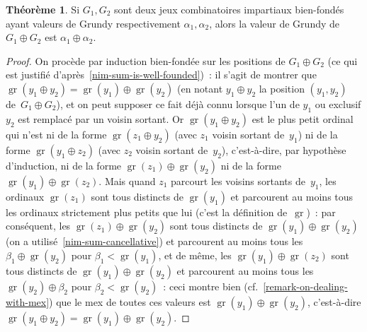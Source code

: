 \documentclass[12pt,a4paper]{article}
\theoremstyle{definition}
\newtheorem{thm}[comcnt]{Théorème}
\newcommand{\gr}{\operatorname{gr}}
\begin{document}
\begin{thm}\label{nim-sum-for-games-versus-ordinals}
Si $G_1,G_2$ sont deux jeux combinatoires impartiaux bien-fondés ayant
valeurs de Grundy respectivement $\alpha_1,\alpha_2$, alors la valeur
de Grundy de $G_1\oplus G_2$ est $\alpha_1\oplus\alpha_2$.
\end{thm}
\begin{proof}
On procède par induction bien-fondée sur les positions de $G_1\oplus
G_2$ (ce qui est justifié d'après \ref{nim-sum-is-well-founded}) : il
s'agit de montrer que $\gr(y_1 \oplus y_2) = \gr(y_1) \oplus \gr(y_2)$
(en notant $y_1\oplus y_2$ la position $(y_1,y_2)$ de $G_1\oplus
G_2$), et on peut supposer ce fait déjà connu lorsque l'un de $y_1$ ou
exclusif $y_2$ est remplacé par un voisin sortant.  Or $\gr(y_1 \oplus
y_2)$ est le plus petit ordinal qui n'est ni de la forme $\gr(z_1
\oplus y_2)$ (avec $z_1$ voisin sortant de $y_1$) ni de la forme
$\gr(y_1 \oplus z_2)$ (avec $z_2$ voisin sortant de $y_2$),
c'est-à-dire, par hypothèse d'induction, ni de la forme $\gr(z_1)
\oplus \gr(y_2)$ ni de la forme $\gr(y_1) \oplus \gr(z_2)$.  Mais
quand $z_1$ parcourt les voisins sortants de $y_1$, les ordinaux
$\gr(z_1)$ sont tous distincts de $\gr(y_1)$ et parcourent au moins
tous les ordinaux strictement plus petits que lui (c'est la définition
de $\gr$) : par conséquent, les $\gr(z_1) \oplus \gr(y_2)$ sont tous
distincts de $\gr(y_1) \oplus \gr(y_2)$ (on a
utilisé \ref{nim-sum-cancellative}) et parcourent au moins tous les
$\beta_1 \oplus \gr(y_2)$ pour $\beta_1 < \gr(y_1)$, et de même, les
$\gr(y_1) \oplus \gr(z_2)$ sont tous distincts de $\gr(y_1) \oplus
\gr(y_2)$ et parcourent au moins tous les $\gr(y_2) \oplus \beta_2$
pour $\beta_2 < \gr(y_2)$ : ceci montre bien
(cf. \ref{remark-on-dealing-with-mex}) que le mex de toutes ces
valeurs est $\gr(y_1) \oplus \gr(y_2)$, c'est-à-dire $\gr(y_1 \oplus
y_2) = \gr(y_1) \oplus \gr(y_2)$.
\end{proof}
\end{document}
